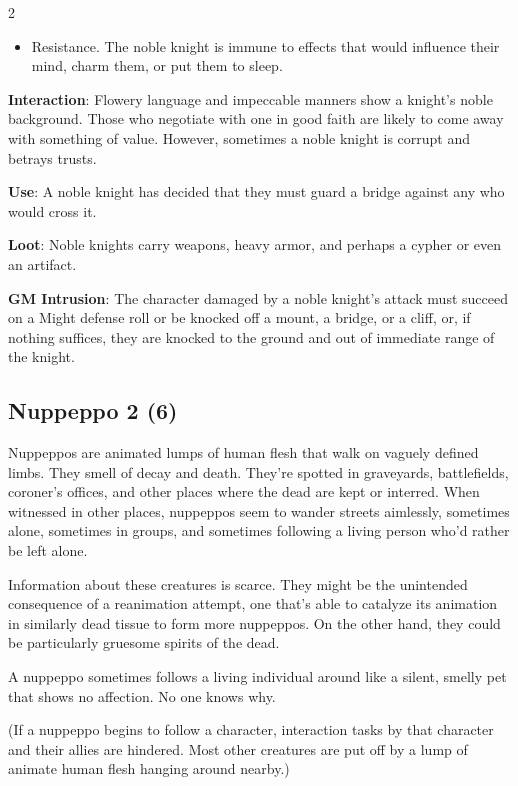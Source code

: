 \begin{multicols}{2}
\begin{itemize}
\item Resistance. The noble knight is immune to effects that would influence their mind, charm them, or put them to sleep. 
\end{itemize}

\textbf{Interaction}: Flowery language and impeccable manners show a knight’s noble background. Those who negotiate with one in good faith are likely to come away with something of value. However, sometimes a noble knight is corrupt and betrays trusts. 

\textbf{Use}: A noble knight has decided that they must guard a bridge against any who would cross it. 

\textbf{Loot}: Noble knights carry weapons, heavy armor, and perhaps a cypher or even an artifact.

\textbf{GM Intrusion}: The character damaged by a noble knight’s attack must succeed on a Might defense roll or be knocked off a mount, a bridge, or a cliff, or, if nothing suffices, they are knocked to the ground and out of immediate range of the knight.

\subsection{Nuppeppo	2 (6)}

Nuppeppos are animated lumps of human flesh that walk on vaguely defined limbs. They smell of decay and death. They’re spotted in graveyards, battlefields, coroner’s offices, and other places where the dead are kept or interred. When witnessed in other places, nuppeppos seem to wander streets aimlessly, sometimes alone, sometimes in groups, and sometimes following a living person who’d rather be left alone.

Information about these creatures is scarce. They might be the unintended consequence of a reanimation attempt, one that’s able to catalyze its animation in similarly dead tissue to form more nuppeppos. On the other hand, they could be particularly gruesome spirits of the dead.

A nuppeppo sometimes follows a living individual around like a silent, smelly pet that shows no affection. No one knows why. 

(If a nuppeppo begins to follow a character, interaction tasks by that character and their allies are hindered. Most other creatures are put off by a lump of animate human flesh hanging around nearby.)


\end{multicols}
